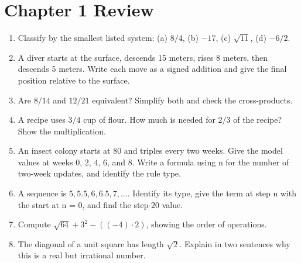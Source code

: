 \section*{Chapter 1 Review}
\begin{enumerate}[label=R\arabic*.,leftmargin=2.5em,itemsep=10pt]
\item Classify by the smallest listed system: (a) $8/4$, (b) $-17$, (c) $\sqrt{11}$, (d) $-6/2$.
\item A diver starts at the surface, descends 15 meters, rises 8 meters, then descends 5 meters. Write each move as a signed addition and give the final position relative to the surface.
\item Are $8/14$ and $12/21$ equivalent? Simplify both and check the cross-products.
\item A recipe uses $3/4$ cup of flour. How much is needed for $2/3$ of the recipe? Show the multiplication.
\item An insect colony starts at 80 and triples every two weeks. Give the model values at weeks 0, 2, 4, 6, and 8. Write a formula using n for the number of two-week updates, and identify the rule type.
\item A sequence is $5,5.5,6,6.5,7,\ldots$. Identify its type, give the term at step n with the start at n = 0, and find the step-20 value.
\item Compute $\sqrt{64}+3^2-((-4)\cdot2)$, showing the order of operations.
\item The diagonal of a unit square has length $\sqrt2$. Explain in two sentences why this is a real but irrational number.
\end{enumerate}
